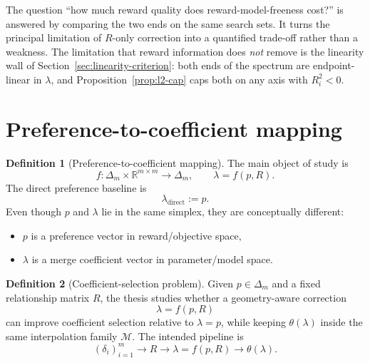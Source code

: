 \documentclass[12pt,a4paper]{report}
\newcommand{\R}{\mathbb{R}}
\newcommand{\1}{\mathbf{1}}
\newcommand{\Mfam}{\mathcal{M}}
\theoremstyle{definition}
\newtheorem{definition}{Definition}
\begin{document}
The question ``how much reward quality does reward-model-freeness cost?'' is answered by comparing the two ends on the same search sets. It turns the principal limitation of \(R\)-only correction into a quantified trade-off rather than a weakness. The limitation that reward information does \emph{not} remove is the linearity wall of Section~\ref{sec:linearity-criterion}: both ends of the spectrum are endpoint-linear in \(\lambda\), and Proposition~\ref{prop:l2-cap} caps both on any axis with \(R^2_i<0\).

\section{Preference-to-coefficient mapping}

\begin{definition}[Preference-to-coefficient mapping]
\label{def:mapping}
The main object of study is
\[
f:\Delta_m\times\R^{m\times m}\to\Delta_m,\qquad \lambda=f(p,R).
\]
The direct preference baseline is
\[
\lambda_{\mathrm{direct}}:=p.
\]
Even though \(p\) and \(\lambda\) lie in the same simplex, they are conceptually different:
\begin{itemize}
    \item \(p\) is a preference vector in reward/objective space,
    \item \(\lambda\) is a merge coefficient vector in parameter/model space.
\end{itemize}
\end{definition}

\begin{definition}[Coefficient-selection problem]
\label{def:selection-problem}
Given \(p\in\Delta_m\) and a fixed relationship matrix \(R\), the thesis studies whether a geometry-aware correction
\[
\lambda=f(p,R)
\]
can improve coefficient selection relative to \(\lambda=p\), while keeping \(\theta(\lambda)\) inside the same interpolation family \(\Mfam\). The intended pipeline is
\[
(\delta_i)_{i=1}^m \longrightarrow R \longrightarrow \lambda=f(p,R) \longrightarrow \theta(\lambda).
\]
\end{definition}
\end{document}
